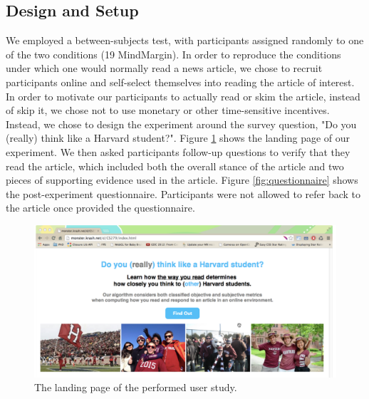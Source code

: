 \subsection{Design and Setup}
We employed a between-subjects test, with participants assigned randomly to one of the two conditions (19 MindMargin). In order to reproduce the conditions under which one would normally read a news article, we chose to recruit participants online and self-select themselves into reading the article of interest. In order to motivate our participants to actually read or skim the article, instead of skip it, we chose not to use monetary or other time-sensitive incentives. Instead, we chose to design the experiment around the survey question, "Do you (really) think like a Harvard student?". Figure \ref{fig:landingpage} shows the landing page of our experiment. We then asked participants follow-up questions to verify that they read the article, which included both the overall stance of the article and two pieces of supporting evidence used in the article. Figure \ref{fig:questionnaire} shows the post-experiment questionnaire. Participants were not allowed to refer back to the article once provided the questionnaire. 

\begin{figure}[h]
\centering
\includegraphics[scale=0.23]{landingpage.png} 
\caption{The landing page of the performed user study.}
\label{fig:landingpage}
\end{figure}

